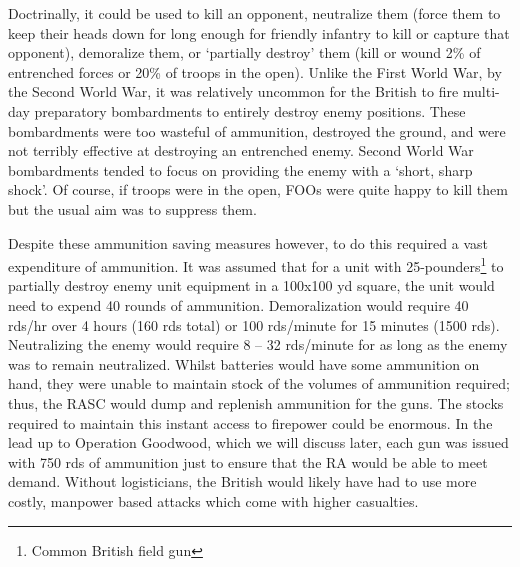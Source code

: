 \documentclass[noraggedright]{turabian-researchpaper}
\begin{document}
Doctrinally, it could be used to kill an opponent,
neutralize them (force them to keep their heads down for long enough for 
friendly infantry to kill or capture that opponent), demoralize them, or 
`partially destroy' them (kill or wound 2\% of entrenched forces or 20\% of 
troops in the open).\autocite[133]{gunfire}  Unlike the First World War, by 
the Second World War, it was relatively uncommon for the British to fire
multi-day preparatory bombardments to entirely destroy enemy positions.  
These bombardments were too wasteful of ammunition, destroyed the ground, and
were not terribly effective at destroying an entrenched enemy.%
Second World War bombardments tended to focus on providing the enemy with a
`short, sharp shock'.  Of course, if troops were in the open, FOOs were quite 
happy to kill them but the usual aim was to suppress them.%

Despite these ammunition saving measures however, to do this required a vast 
expenditure of ammunition.  It was assumed that for a unit with
25-pounders\footnote{Common British field gun} to partially destroy enemy unit
equipment in a 100x100 yd square, the unit would need to expend 40 rounds of
ammunition.  Demoralization would require 40 rds/hr over 4 hours (160 rds 
total) or 100 rds/minute for 15 minutes (1500 rds).  Neutralizing the enemy 
would require 8 -- 32 rds/minute for as long as the enemy was to remain 
neutralized.\autocite[133]{gunfire}  Whilst batteries would have some
ammunition on hand, %
they were unable to maintain stock of the volumes of ammunition required; thus,
the RASC would dump and replenish ammunition for the guns.  
The stocks required to maintain this instant access to firepower could be 
enormous.  In the lead up to Operation Goodwood, which we will discuss later,
each gun was issued with 750 rds of ammunition just to ensure that the RA would
be able to meet demand.%
  Without logisticians, the British would likely have 
had to use more costly, manpower based attacks which come with higher 
casualties.  
\end{document}

